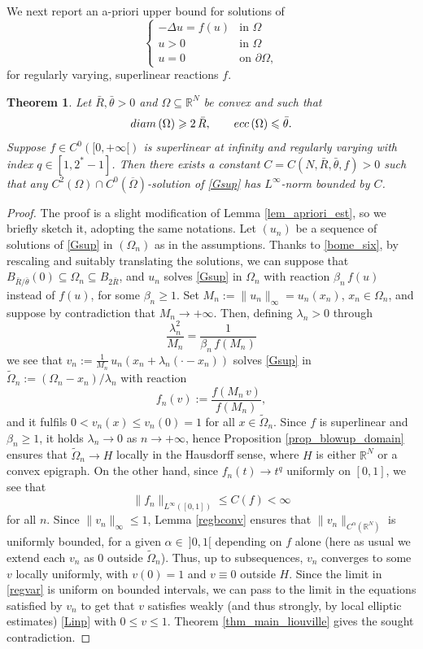 \documentclass[12pt]{amsart}
\numberwithin{equation}{section}
\newtheorem{theorem}{Theorem}[section]
\theoremstyle{plain}
\theoremstyle{plain}
\theoremstyle{plain}
\theoremstyle{definition}
\newcommand{\R}{{\mathbb R}}
\newcommand{\beq}{\begin{equation}}
\newcommand{\eeq}{\end{equation}}
\renewcommand{\le}{\leqslant}
\renewcommand{\ge}{\geqslant}
\begin{document}
We next report an a-priori upper bound for solutions of
\beq
\label{Gsup}
\begin{cases}
-\Delta u= f(u)&\text{in $\Omega$}\\
u>0&\text{in $\Omega$}\\
u=0&\text{on $\partial\Omega$},
\end{cases}
\eeq
for regularly varying, superlinear reactions $f$.

\begin{theorem}
\label{thm_equibound}
Let $\bar R, \bar\theta>0$ and $\Omega\subseteq \R^N$ be convex and such that
\beq
\label{bome_six}
{\rm diam}\,(\Omega)\ge 2\, \bar R, \qquad {\rm ecc}\, (\Omega)\le \bar\theta.
\eeq
Suppose $f\in C^0([0, +\infty[)$ is superlinear at infinity and regularly varying with index $q\in [1, 2^*-1]$. 
Then there exists a constant $C=C(N, \bar R, \bar \theta, f)>0$ such that any $C^2(\Omega)\cap C^0(\overline{\Omega})$-solution of \eqref{Gsup} has $L^\infty$-norm bounded by $C$.
\end{theorem}

\begin{proof}
The proof is a slight modification of Lemma \ref{lem_apriori_est}, so we briefly sketch it, adopting the same notations.
Let $(u_n)$ be a sequence of solutions of \eqref{Gsup} in $(\Omega_n)$ as in the assumptions. 
Thanks to \eqref{bome_six}, by rescaling and suitably translating the solutions, we can suppose that $B_{\bar R/\bar\theta}(0)\subseteq \Omega_n\subseteq B_{2\bar R}$, and $u_n$ solves \eqref{Gsup} in $\Omega_n$ with reaction $\beta_n\, f(u)$ instead of $f(u)$, for some $\beta_n\ge 1$.
Set $M_n:=\|u_n\|_\infty=u_n(x_n)$, $x_n \in \Omega_n$, and suppose by contradiction that $M_n\to +\infty$. 
Then, defining $\lambda_n>0$ through
\[
\frac{\lambda_n^2}{M_n}=\frac{1}{\beta_n\, f(M_n)}
\]
we see that 
$v_n:=\frac{1}{M_n}\, u_n(x_n+\lambda_n(\cdot-x_n))
$
solves \eqref{Gsup} in $\widetilde{\Omega}_n:=(\Omega_n-x_n)/\lambda_n$ with reaction
\[
f_n(v):=\frac{f(M_n\, v)}{f(M_n)},
\]
and it fulfils $0< v_n(x)\le v_n(0)=1$ for all $x\in \widetilde{\Omega}_n$.
Since $f$ is superlinear and $\beta_n\ge 1$, it holds $\lambda_n\to 0$ as $n\to +\infty$, hence Proposition \ref{prop_blowup_domain} ensures that $\widetilde{\Omega}_n\to H$ locally in the Hausdorff sense, where $H$ is either $\R^N$ or a convex epigraph. 
On the other hand, since $f_n(t)\to t^q$ uniformly on $[0, 1]$, we see that 
\[
\|f_n\|_{L^\infty([0, 1])}\le C(f)<\infty
\]
for all $n$. Since $\|v_n\|_\infty\le 1$, Lemma \ref{regbconv} ensures that $\|v_n\|_{C^\alpha(\R^N)}$ is uniformly bounded, for a given $\alpha\in \ ]0, 1[$ depending on $f$ alone (here as usual we extend each $v_n$ as $0$ outside $\widetilde{\Omega}_n$). 
Thus, up to subsequences, $v_n$ converges to some $v$ locally uniformly, with $v(0)=1$ and $v\equiv 0$ outside $H$. 
Since the limit in \eqref{regvar} is uniform on bounded intervals, we can pass to the limit in the equations satisfied by $v_n$ to get that $v$ satisfies weakly (and thus strongly, by local elliptic estimates) \eqref{Linp} with $0 \leq v \leq 1$. 
 Theorem \ref{thm_main_liouville} gives the sought contradiction.
\end{proof}
\end{document}
